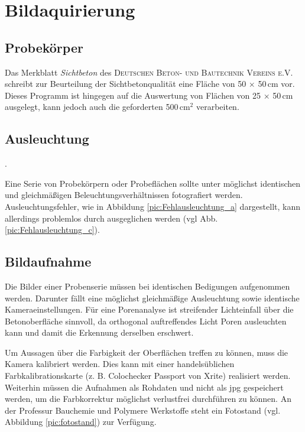 \documentclass{article}
\begin{document}
\section{Bildaquirierung}
\subsection{Probekörper}
Das Merkblatt \textit{Sichtbeton} des \textsc{Deutschen Beton- und Bautechnik Vereins e.V.} schreibt zur Beurteilung der Sichtbetonqualität eine Fläche von 50 $\times$ 50\,cm vor. Dieses Programm ist hingegen auf die Auswertung von Flächen von 25 $\times$ 50\,cm ausgelegt, kann jedoch auch die geforderten 500\,cm$^2$ verarbeiten.

\subsection{Ausleuchtung}.

Eine Serie von Probekörpern oder Probeflächen sollte unter möglichst identischen und gleichmäßigen Beleuchtungsverhältnissen fotografiert werden. Ausleuchtungsfehler, wie in Abbildung \ref{pic:Fehlausleuchtung_a} dargestellt, kann allerdings problemlos durch ausgeglichen werden (vgl Abb. \ref{pic:Fehlausleuchtung_c}).

\subsection{Bildaufnahme}

Die Bilder einer Probenserie müssen bei identischen Bedigungen aufgenommen werden. Darunter fällt eine möglichst gleichmäßige Ausleuchtung sowie identische Kameraeinstellungen.
Für eine Porenanalyse ist streifender Lichteinfall über die Betonoberfläche sinnvoll, da orthogonal auftreffendes Licht Poren ausleuchten kann und damit die Erkennung derselben erschwert.

Um Aussagen über die Farbigkeit der Oberflächen treffen zu können, muss die Kamera kalibriert werden. Dies kann mit einer handelsüblichen Farbkalibrationskarte (z. B. Colochecker Passport von Xrite) realisiert werden. Weiterhin müssen die Aufnahmen als Rohdaten und nicht als jpg gespeichert werden, um die Farbkorrektur möglichst verlustfrei durchführen zu können.
An der Professur Bauchemie und Polymere Werkstoffe steht  ein Fotostand (vgl. Abbildung \ref{pic:fotostand}) zur Verfügung.
\end{document}
